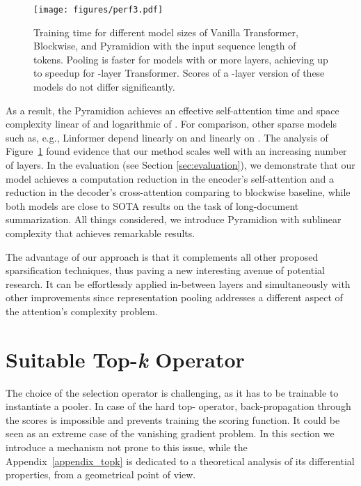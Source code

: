 \documentclass{article}
\begin{document}
\begin{figure}
        \centering
        \texttt{[image: figures/perf3.pdf]}
        \caption{Training time for different model sizes of Vanilla Transformer, Blockwise, and Pyramidion  with the input sequence length of  tokens.
        Pooling is faster for models with  or more layers, achieving up to  speedup for -layer Transformer. Scores of a -layer version of these models do not differ significantly.
        }
        \label{fig:performance_benchmark}
\end{figure}

As a result, the Pyramidion achieves an effective self-attention time and space complexity linear of  and logarithmic of . 
For comparison, other sparse models such as, e.g., Linformer depend linearly on  and linearly on . The analysis of Figure~\ref{fig:performance_benchmark} found evidence that our method scales well with an increasing number of layers. In the evaluation (see Section \ref{sec:evaluation}), we demonstrate that our model achieves a  computation reduction in the encoder's self-attention and a  reduction in the decoder's cross-attention comparing to blockwise baseline, while both models are close to SOTA results on the task of long-document summarization.
All things considered, we introduce Pyramidion with sublinear complexity that achieves remarkable results.

The advantage of our approach is that it complements all other proposed sparsification techniques, thus paving a new interesting avenue of potential research. 
It can be effortlessly applied in-between layers and simultaneously with other improvements since representation pooling addresses a different aspect of the attention's complexity problem.

\section{Suitable Top-\textit{k} Operator} \label{sec:topk}
The choice of the selection operator is challenging, as it has to be trainable to instantiate a pooler.
In case of the hard top- operator,  back-propagation through the scores is impossible and prevents training the scoring function.  It could be seen as an extreme case of the vanishing gradient problem. In this section we introduce a mechanism not prone to this issue, while the Appendix~\ref{appendix_topk} is dedicated to a theoretical analysis of its differential properties, from a geometrical point of view.
\end{document}
